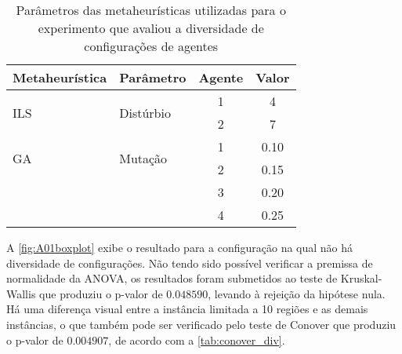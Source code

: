 \begin{table}[ht!]
    \centering
    \caption{Parâmetros das metaheurísticas utilizadas para o experimento que avaliou a diversidade de configurações de agentes}
    \begin{tabular}{llcc}
        \toprule
         \textbf{Metaheurística}    & \textbf{Parâmetro}            & \textbf{Agente}       & \textbf{Valor}    \\
         \midrule
         \multirow{2}{*}{ILS}       & \multirow{2}{*}{Distúrbio}    & 1                     & 4         \\
                                    &                               & 2                     & 7         \\
         \midrule
         \multirow{2}{*}{GA}        & \multirow{2}{*}{Mutação}      & 1                     & 0.10      \\
                                    &                               & 2                     & 0.15      \\
                                    &                               & 3                     & 0.20      \\
                                    &                               & 4                     & 0.25      \\
        \bottomrule
    \end{tabular}
    \label{tab:expDiversidade}
\end{table}

A \autoref{fig:A01boxplot} exibe o resultado para a configuração na qual não há diversidade de configurações. Não tendo sido possível verificar a premissa de normalidade da ANOVA, os resultados foram submetidos ao teste de Kruskal-Wallis que produziu o p-valor de $0.048590$, levando à rejeição da hipótese nula. Há uma diferença visual entre a instância limitada a 10 regiões e as demais instâncias, o que também pode ser verificado pelo teste de Conover que produziu o p-valor de $0.004907$, de acordo com a \autoref{tab:conover_div}. 

